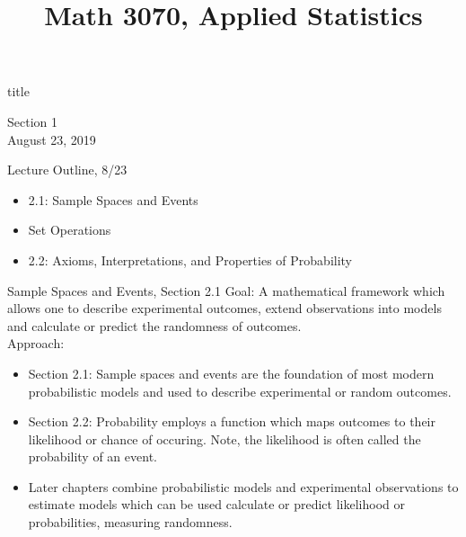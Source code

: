 \documentclass{beamer}
\title{Math 3070, Applied Statistics}
\newcommand{\nl}[1]{\vspace{#1 em}}
\begin{document}
\begin{frame}
    \begin{beamercolorbox}[rounded=true,wd=\textwidth,center]{title}
        \inserttitle
    \end{beamercolorbox}
    \begin{center}
        Section 1\\
        \nl{0.5}
        August 23, 2019
    \end{center}

\end{frame}

\begin{frame}{Lecture Outline, 8/23}
    \begin{itemize}
        \item 2.1: Sample Spaces and Events
        \item Set Operations
        \item 2.2: Axioms, Interpretations, and Properties of Probability
    \end{itemize}
\end{frame}

\begin{frame}{Sample Spaces and Events, Section 2.1}
    Goal: A mathematical framework which allows one to describe experimental outcomes, extend observations into models and calculate or predict the randomness of outcomes.\\
    \nl{0.5}
    Approach:
    \begin{itemize}
        \item Section 2.1: Sample spaces and events are the foundation of most modern probabilistic models and used to describe experimental or random outcomes.
        \item Section 2.2: Probability employs a function which maps outcomes to their likelihood or chance of occuring. Note, the likelihood is often called the probability of an event.
        \item Later chapters combine probabilistic models and experimental observations to estimate models which can be used calculate or predict likelihood or probabilities, measuring randomness.
    \end{itemize}
\end{frame}
\end{document}
